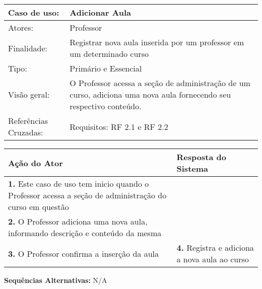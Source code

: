 \documentclass[12pt,a4paper,onecolumn,titlepage]{article}
\begin{document}
\begin{table}[h!]
\begin{center}
\begin{tabular}{p{2.5cm} p{9.5cm}}
Caso de uso: & \textbf{Adicionar Aula} \\ \hline
Atores: & Professor \\ \hline
Finalidade: & Registrar nova aula inserida por um professor em um determinado curso\\ \hline
Tipo: & Primário e Essencial \\ \hline
Visão geral: & O Professor acessa a seção de administração de um curso, adiciona uma nova aula fornecendo seu respectivo conteúdo. \\ \hline
Referências Cruzadas: & Requisitos: RF 2.1 e RF 2.2\\

\end{tabular}
\end{center}
\end{table} 

\begin{center}
\def\arraystretch{1.1}
\begin{tabular}{|p{6cm}|p{6cm}|}

\hline
\textbf{Ação do Ator} & \textbf{Resposta do Sistema} \\ \hline
\textbf{1.} Este caso de uso tem inicio quando o Professor acessa a seção de administração do curso em questão  & \\ \hline
\textbf{2.} O Professor adiciona uma nova aula, informando descrição e conteúdo da mesma & \\ \hline
\textbf{3.} O Professor confirma a inserção da aula  & \textbf{4.} Registra e adiciona a nova aula ao curso\\ \hline
\end{tabular}
\end{center}

\textbf{Sequências Alternativas:} N/A

\newpage
\end{document}
